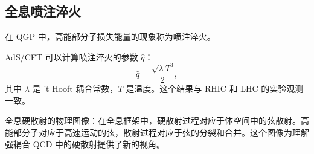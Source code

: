 \subsection{全息喷注淬火}

在 QGP 中，高能部分子损失能量的现象称为喷注淬火。

\begin{definition}[全息喷注淬火]
AdS/CFT 可以计算喷注淬火的参数 $\hat{q}$：
\begin{equation}
    \hat{q} = \frac{\sqrt{\lambda} T^3}{2},
\end{equation}
其中 $\lambda$ 是 't Hooft 耦合常数，$T$ 是温度。这个结果与 RHIC 和 LHC 的实验观测一致。
\end{definition}

\begin{remark}
全息硬散射的物理图像：在全息框架中，硬散射过程对应于体空间中的弦散射。高能部分子对应于高速运动的弦，散射过程对应于弦的分裂和合并。这个图像为理解强耦合 QCD 中的硬散射提供了新的视角。
\end{remark}

